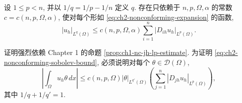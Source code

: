 \begin{Theorem}
\label{thm:ch2-discrete-sobolev-nonconforming}
设 $1\leq p<n$, 并以 $1/q=1/p-1/n$ 定义 $q$. 存在只依赖于 $n,p,\Omega,\alpha$ 的常数 $c=c(n,p,\Omega,\alpha)$, 使对每个形如 \eqref{eq:ch2-nonconforming-expansion} 的函数,
\begin{equation}
|u_h|_{L^q(\Omega)}
\leq c(n,p,\Omega,\alpha)
\sum_{i=1}^{n}|D_{ih}u_h|_{L^p(\Omega)}.
\label{eq:ch2-nonconforming-sobolev-bound}
\end{equation}
\end{Theorem}

\begin{Proof}
证明强烈依赖 Chapter 1 的命题 \ref{prop:ch1-nc-jh-lp-estimate}. 为证明 \eqref{eq:ch2-nonconforming-sobolev-bound}, 必须说明对每个 $\theta\in\mathcal D(\Omega)$,
\begin{equation}
\left|\int_\Omega u_h\theta\,dx\right|
\leq c(n,p,\Omega)|\theta|_{L^{q'}(\Omega)}
\left(\sum_{j=1}^{n}|D_{jh}u_h|_{L^p(\Omega)}\right),
\label{eq:ch2-nonconforming-duality-bound}
\end{equation}
其中 $1/q+1/q'=1$.


\end{Proof}
